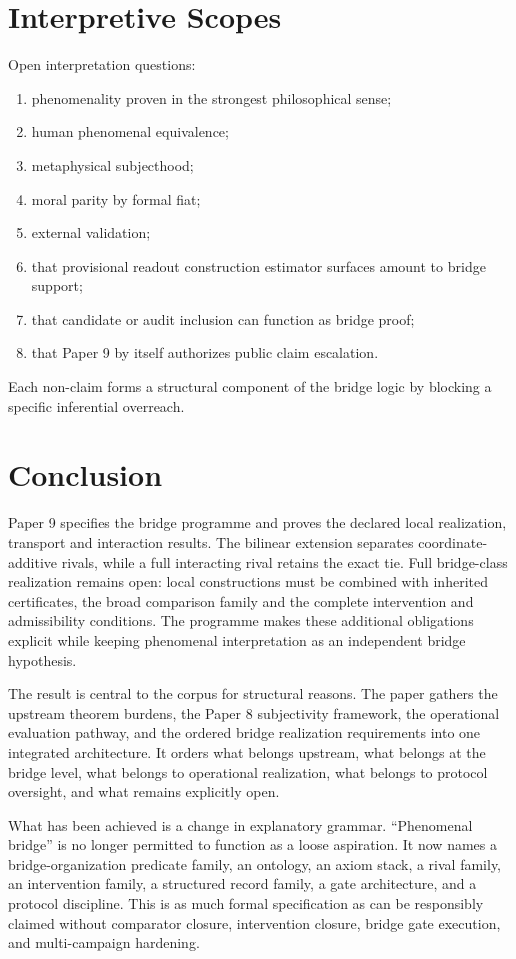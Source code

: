 \documentclass[11pt,a4paper]{article}
\theoremstyle{definition}
\begin{document}
\section{Interpretive Scopes}
Open interpretation questions:
\begin{enumerate}[leftmargin=1.5em]
\item phenomenality proven in the strongest philosophical sense;
\item human phenomenal equivalence;
\item metaphysical subjecthood;
\item moral parity by formal fiat;
\item external validation;
\item that provisional readout construction estimator surfaces amount to bridge support;
\item that candidate or audit inclusion can function as bridge proof;
\item that Paper 9 by itself authorizes public claim escalation.
\end{enumerate}
Each non-claim forms a structural component of the bridge logic by blocking a specific inferential overreach.

\section{Conclusion}
Paper 9 specifies the bridge programme and proves the declared local realization, transport and interaction results. The bilinear extension separates coordinate-additive rivals, while a full interacting rival retains the exact tie. Full bridge-class realization remains open: local constructions must be combined with inherited certificates, the broad comparison family and the complete intervention and admissibility conditions. The programme makes these additional obligations explicit while keeping phenomenal interpretation as an independent bridge hypothesis.

The result is central to the corpus for structural reasons. The paper gathers the upstream theorem burdens, the Paper 8 subjectivity framework, the operational evaluation pathway, and the ordered bridge realization requirements into one integrated architecture. It orders what belongs upstream, what belongs at the bridge level, what belongs to operational realization, what belongs to protocol oversight, and what remains explicitly open.

What has been achieved is a change in explanatory grammar. ``Phenomenal bridge'' is no longer permitted to function as a loose aspiration. It now names a bridge-organization predicate family, an ontology, an axiom stack, a rival family, an intervention family, a structured record family, a gate architecture, and a protocol discipline. This is as much formal specification as can be responsibly claimed without comparator closure, intervention closure, bridge gate execution, and multi-campaign hardening.
\end{document}
